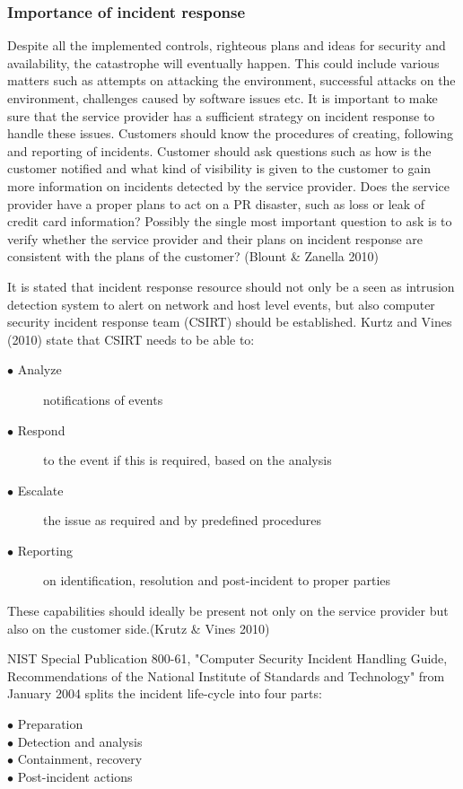 \documentclass{article}
\begin{document}
\subsubsection{Importance of incident response}
Despite all the implemented controls, righteous plans and ideas for security and availability, the catastrophe will eventually happen. This could include various matters such as attempts on attacking the environment, successful attacks on the environment, challenges caused by software issues etc. It is important to make sure that the service provider has a sufficient strategy on incident response to handle these issues. Customers should know the procedures of creating, following and reporting of incidents. Customer should ask questions such as how is the customer notified and what kind of visibility is given to the customer to gain more information on incidents detected by the service provider. Does the service provider have a proper plans to act on a PR disaster, such as loss or leak of credit card information? Possibly the single most important question to ask is to verify whether the service provider and their plans on incident response are consistent with the plans of the customer? (Blount \& Zanella 2010)
\par
It is stated that incident response resource should not only be a seen as intrusion detection system to alert on network and host level events, but also computer security incident response team (CSIRT) should be established. Kurtz and Vines (2010) state that CSIRT needs to be able to:
\begin{description}
	\item[$\bullet$ Analyze] notifications of events
	\item[$\bullet$ Respond] to the event if this is required, based on the analysis
	\item[$\bullet$ Escalate] the issue as required and by predefined procedures
	\item[$\bullet$ Reporting] on identification, resolution and post-incident to proper parties
\end{description}
These capabilities should ideally be present not only on the service provider but also on the customer side.(Krutz \& Vines 2010)
\par
NIST Special Publication 800-61, "Computer Security Incident Handling Guide, Recommendations of the National Institute of Standards and Technology" from January 2004 splits the incident life-cycle into four parts:
\begin{description}
	\item[$\bullet$ Preparation]
	\item[$\bullet$ Detection and analysis]
	\item[$\bullet$ Containment, recovery]
	\item[$\bullet$ Post-incident actions]
\end{description}
\end{document}
